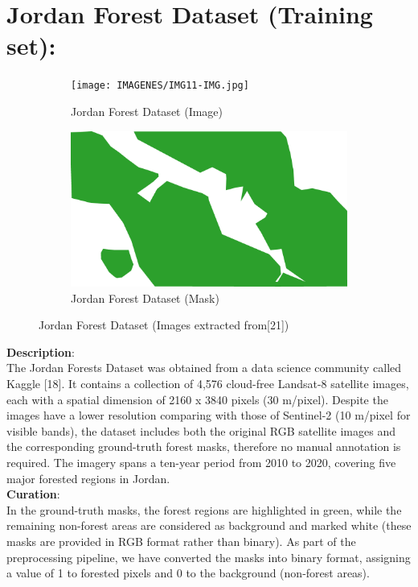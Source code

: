 \section{Jordan Forest Dataset (Training set):}
\begin{figure}[H]
\centering
\begin{subfigure}{0.49\textwidth}
\centering
\texttt{[image: IMAGENES/IMG11-IMG.jpg]}
\caption{Jordan Forest Dataset (Image)}
\label{fig:left}
\end{subfigure}
\begin{subfigure}{0.49\textwidth}
\centering
\includegraphics[width = \textwidth]{IMAGENES/IMG11-MASK.png}
\caption{Jordan Forest Dataset  (Mask)}
\label{fig:right}
\end{subfigure}
\caption{Jordan Forest Dataset (Images extracted from[21])}
\label{fig:combined}
\end{figure}


\textbf{Description}: 
\\
The Jordan Forests Dataset was obtained from a data science community called Kaggle [18]. It contains a collection of 4,576 cloud-free Landsat-8 satellite images, each with a spatial dimension of 2160 x 3840 pixels (30 m/pixel). Despite the images have a lower resolution comparing with those of Sentinel-2 (10 m/pixel for visible bands), the dataset includes both the original RGB satellite images and the corresponding ground-truth forest masks, therefore no manual annotation is required. The imagery spans a ten-year period from 2010 to 2020, covering five major forested regions in Jordan.\\ 

\textbf{Curation}: 
\\
In the ground-truth masks, the forest regions are highlighted in green, while the remaining non-forest areas are considered as background and marked white (these masks are provided in RGB format rather than binary). As part of the preprocessing pipeline, we have converted the masks into binary format, assigning a value of 1 to forested pixels and 0 to the background (non-forest areas).\\

